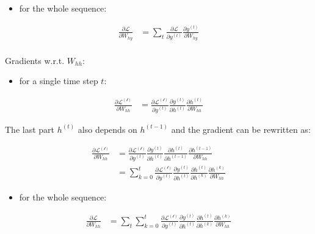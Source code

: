 \documentclass[]{krantz}
\providecommand{\tightlist}{%
  \setlength{\itemsep}{0pt}\setlength{\parskip}{0pt}}
\begin{document}
\begin{itemize}
\tightlist
\item
  for the whole sequence:
\end{itemize}

\begin{align}
\frac{\partial \mathcal{L}}{\partial W_{hy}} & = \sum_{t} \frac{\partial \mathcal{L}}{\partial y^{(t)}} \frac{\partial y^{(t)}} {\partial W_{hy}}  \label{eq:rnn-back-hy-all} \\
\end{align}

Gradients w.r.t. \(W_{hh}\):

\begin{itemize}
\tightlist
\item
  for a single time step \(t\):
\end{itemize}

\begin{align}
\frac{\partial \mathcal{L^{(t)}}}{\partial W_{hh}} & = \frac{\partial \mathcal{L^{(t)}}}{\partial y^{(t)}} \frac{\partial y^{(t)}}{\partial h^{(t)}} \frac{\partial h^{(t)}}{\partial W_{hh}} \label{eq:rnn-back-hh-one}
\end{align}

The last part \(h^{(t)}\) also depends on \(h^{(t-1)}\) and the gradient can be rewritten as:

\begin{align}
\frac{\partial \mathcal{L^{(t)}}}{\partial W_{hh}}
& = \frac{\partial \mathcal{L^{(t)}}}{\partial y^{(t)}} \frac{\partial y^{(t)}}{\partial h^{(t)}} \frac{\partial h^{(t)}}{\partial h^{(t-1)}} \frac{\partial h^{(t-1)}}{\partial W_{hh}} \\
& = \sum_{k=0}^{t} \frac{\partial \mathcal{L^{(t)}}}{\partial y^{(t)}} \frac{\partial y^{(t)}}{\partial h^{(t)}} \frac{\partial h^{(t)}}{\partial h^{(k)}} \frac{\partial h^{(k)}}{\partial W_{hh}} \label{eq:rnn-back-hh-one-one}
\end{align}

\begin{itemize}
\tightlist
\item
  for the whole sequence:
\end{itemize}

\begin{align}
\frac{\partial \mathcal{L}}{\partial W_{hh}}
& = \sum_{t} \sum_{k=0}^{t} \frac{\partial \mathcal{L^{(t)}}}{\partial y^{(t)}} \frac{\partial y^{(t)}}{\partial h^{(t)}} \frac{\partial h^{(t)}}{\partial h^{(k)}} \frac{\partial h^{(k)}}{\partial W_{hh}} \label{eq:rnn-back-hh-all}
\end{align}
\end{document}
